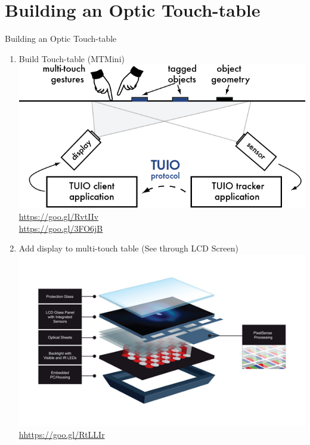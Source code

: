 \section{Building an Optic Touch-table}
\begin{frame}%
\begin{block}{Building an Optic Touch-table}
\begin{minipage}{1.0\linewidth}
\begin{enumerate}
\item Build Touch-table (MTMini)\\
\includegraphics[scale=.19]{images/mesa1.png}\\ 
\url{https://goo.gl/RvtIIv}\\
\url{https://goo.gl/3FO6jB}
\item Add display to multi-touch table (See through LCD Screen)\\
\includegraphics[scale=.19]{images/mesa2.jpg}\\
\url{hhttps://goo.gl/RtLLIr}
\end{enumerate}
\end{minipage}
\end{block}
\end{frame}
